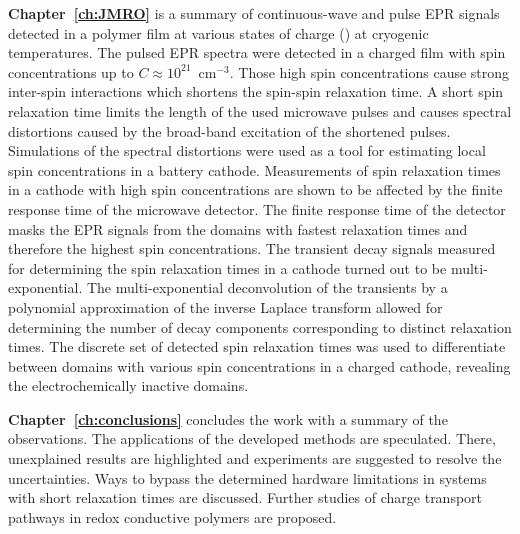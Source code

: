 \par
\textbf{Chapter~\ref{ch:JMRO}} is a summary of continuous-wave and pulse EPR signals detected in a polymer  film at various states of charge () at cryogenic temperatures. The pulsed EPR spectra were detected in a charged film with spin concentrations up to $C\approx10^{21}$~cm$^{-3}$. Those high spin concentrations cause strong inter-spin interactions which shortens the spin-spin relaxation time. A short spin relaxation time limits the length of the used microwave pulses and causes spectral distortions caused by the broad-band excitation of the shortened pulses. Simulations of the spectral distortions were used as a tool for estimating local spin concentrations in a battery cathode. Measurements of spin relaxation times in a cathode with high spin concentrations are shown to be affected by the finite response time of the microwave detector. The finite response time of the detector masks the EPR signals from the domains with fastest relaxation times and therefore the highest spin concentrations. The transient decay signals measured for determining the spin relaxation times in a cathode turned out to be multi-exponential. The multi-exponential deconvolution of the transients by a polynomial approximation of the inverse Laplace transform allowed for determining the number of decay components corresponding to distinct relaxation times. The discrete set of detected spin relaxation times was used to differentiate between domains with various spin concentrations in a charged cathode, revealing the electrochemically inactive domains.\\

\par
\textbf{Chapter~\ref{ch:conclusions}} concludes the work with a summary of the observations. The applications of the developed methods are speculated. There, unexplained results are highlighted and experiments are suggested to resolve the uncertainties. Ways to bypass the determined hardware limitations in systems with short relaxation times are discussed. Further studies of charge transport pathways in redox conductive polymers are proposed.
